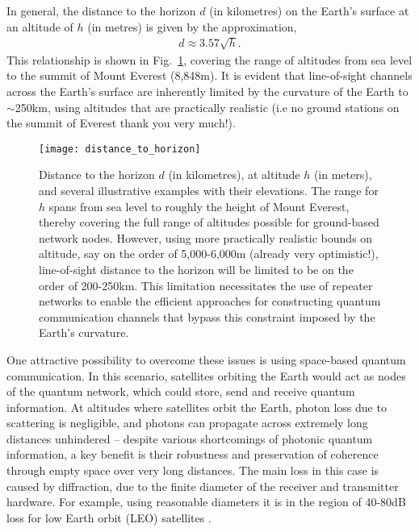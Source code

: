 In general, the distance to the horizon $d$ (in kilometres) on the Earth's surface at an altitude of $h$ (in metres) is given by the approximation,
\begin{align}
d \approx 3.57\sqrt{h}.
\end{align}
This relationship is shown in Fig.~\ref{fig:dist_hor}, covering the range of altitudes from sea level to the summit of Mount Everest (8,848m). It is evident that line-of-sight channels across the Earth's surface are inherently limited by the curvature of the Earth to $\sim$250km, using altitudes that are practically realistic (i.e no ground stations on the summit of Everest thank you very much!).

\begin{figure}[!htb]
\texttt{[image: distance\_to\_horizon]}
\caption{Distance to the horizon $d$ (in kilometres), at altitude $h$ (in meters), and several illustrative examples with their elevations. The range for $h$ spans from sea level to roughly the height of Mount Everest, thereby covering the full range of altitudes possible for ground-based network nodes. However, using more practically realistic bounds on altitude, say on the order of 5,000-6,000m (already very optimistic!), line-of-sight distance to the horizon will be limited to be on the order of 200-250km. This limitation necessitates the use of repeater networks to enable the efficient approaches for constructing quantum communication channels that bypass this constraint imposed by the Earth's curvature.} \label{fig:dist_hor}
\end{figure}

One attractive possibility to overcome these issues is using space-based quantum communication. In this scenario, satellites orbiting the Earth would act as nodes of the quantum network, which could store, send and receive quantum information. At altitudes where satellites orbit the Earth, photon loss due to scattering is negligible, and photons can propagate across extremely long distances unhindered -- despite various shortcomings of photonic quantum information, a key benefit is their robustness and preservation of coherence through empty space over very long distances. The main loss in this case is caused by diffraction, due to the finite diameter of the receiver and transmitter hardware. For example, using reasonable diameters it is in the region of 40-80dB loss for low Earth orbit (LEO) satellites \cite{bib:aspelmeyer2003long, bib:liao2016ground}.

